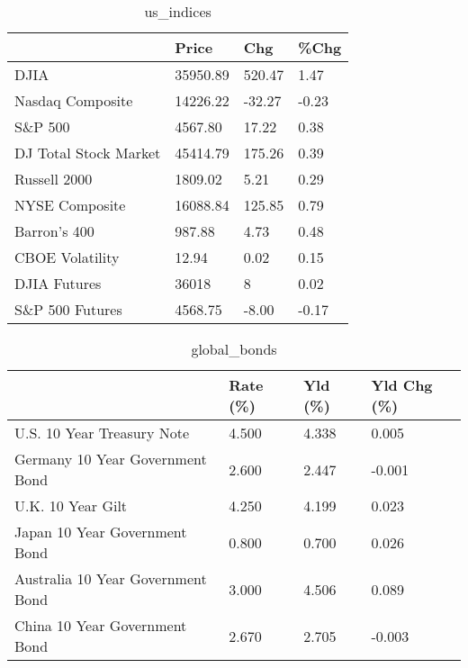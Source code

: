 \documentclass{article}%
\begin{document}
%


\begin{table}[htbp]%
\caption{us\_indices}%
\centering%
\begin{adjustbox}{width=1\textwidth}%
\begin{tabular}{llll}
\toprule
                      &    Price &    Chg &  \%Chg \\
\midrule
                 DJIA & 35950.89 & 520.47 &  1.47 \\
     Nasdaq Composite & 14226.22 & -32.27 & -0.23 \\
              S\&P 500 &  4567.80 &  17.22 &  0.38 \\
DJ Total Stock Market & 45414.79 & 175.26 &  0.39 \\
         Russell 2000 &  1809.02 &   5.21 &  0.29 \\
       NYSE Composite & 16088.84 & 125.85 &  0.79 \\
         Barron's 400 &   987.88 &   4.73 &  0.48 \\
      CBOE Volatility &    12.94 &   0.02 &  0.15 \\
         DJIA Futures &    36018 &      8 &  0.02 \\
      S\&P 500 Futures &  4568.75 &  -8.00 & -0.17 \\
\bottomrule
\end{tabular}
%
\end{adjustbox}%
\end{table}

%


\begin{table}[htbp]%
\caption{global\_bonds}%
\centering%
\begin{adjustbox}{width=1\textwidth}%
\begin{tabular}{llll}
\toprule
                                  & Rate (\%) & Yld (\%) & Yld Chg (\%) \\
\midrule
       U.S. 10 Year Treasury Note &    4.500 &   4.338 &       0.005 \\
  Germany 10 Year Government Bond &    2.600 &   2.447 &      -0.001 \\
                U.K. 10 Year Gilt &    4.250 &   4.199 &       0.023 \\
    Japan 10 Year Government Bond &    0.800 &   0.700 &       0.026 \\
Australia 10 Year Government Bond &    3.000 &   4.506 &       0.089 \\
    China 10 Year Government Bond &    2.670 &   2.705 &      -0.003 \\
\bottomrule
\end{tabular}
%
\end{adjustbox}%
\end{table}
\end{document}
